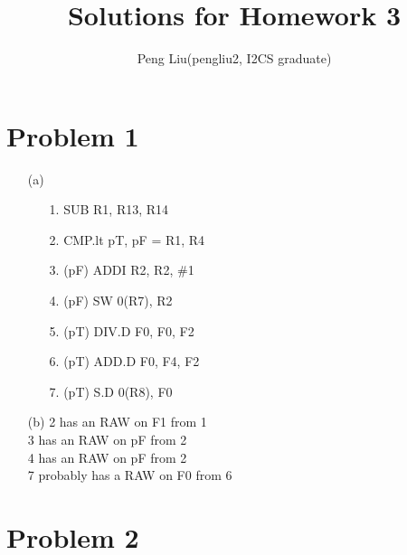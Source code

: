 \documentclass[11pt,leqno]{article}
\author{Peng Liu(pengliu2, I2CS graduate)}
\title{Solutions for Homework 3}
\begin{document}
\maketitle
\section*{Problem 1}

\begin{enumerate}
\item[(a)]
  \begin{enumerate}
  \item[1.] SUB R1, R13, R14
  \item[2.] CMP.lt pT, pF = R1, R4
  \item[3.] (pF) ADDI R2, R2, \#1
  \item[4.] (pF) SW 0(R7), R2
  \item[5.] (pT) DIV.D F0, F0, F2
  \item[6.] (pT) ADD.D F0, F4, F2
  \item[7.] (pT) S.D 0(R8), F0
  \end{enumerate}

\item[(b)] 2 has an RAW on F1 from 1\\
  3 has an RAW on pF from 2\\
  4 has an RAW on pF from 2\\
  7 probably has a RAW on F0 from 6

\end{enumerate}

\section*{Problem 2}
\end{document}
